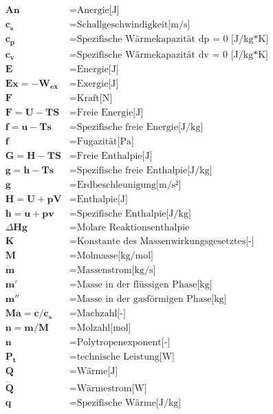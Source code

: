 \documentclass[twocolumn]{article}
\begin{document}
\begin{align*}
	\mathbf{An}		&=	\text{Anergie[J]} \\
	\mathbf{c_s}		&=	\text{Schallgeschwindigkeit[m/s]} \\
	\mathbf{c_p}		&=	\text{Spezifische Wärmekapazität dp = 0 [J/kg*K]} \\
	\mathbf{c_v}		&=	\text{Spezifische Wärmekapazität dv = 0 [J/kg*K]} \\
	\mathbf{E}		&=	\text{Energie[J]} \\
	\mathbf{Ex = -W_{ex}}	&=	\text{Exergie[J]} \\
	\mathbf{F}		&=	\text{Kraft[N]} \\
	\mathbf{F = U - TS}	&=	\text{Freie Energie[J]} \\
	\mathbf{f = u-Ts}	&=	\text{Spezifische freie Energie[J/kg]} \\
	\mathbf{f}		&=	\text{Fugazität[Pa]} \\
	\mathbf{G = H -TS}	&=	\text{Freie Enthalpie[J]} \\
	\mathbf{g = h -Ts}	&=	\text{Spezifische freie Enthalpie[J/kg]} \\
	\mathbf{g}		&=	\text{Erdbeschleunigung[m/s²]} \\
	\mathbf{H = U+pV}	&=	\text{Enthalpie[J]} \\
	\mathbf{h = u + pv}	&=	\text{Spezifische Enthalpie[J/kg]} \\
	\Delta \mathbf{Hg}	&=	\text{Molare Reaktionsenthalpie} \\
	\mathbf{K}		&=	\text{Konstante des Massenwirkungsgesetztes[-]} \\
	\mathbf{M}		&=	\text{Molmasse[kg/mol]} \\
	\mathbf{\dot{m}}	&=	\text{Massenstrom[kg/s]} \\
	\mathbf{m'}		&=	\text{Masse in der flüssigen Phase[kg]} \\
	\mathbf{m''}		&=	\text{Masse in der gasförmigen Phase[kg]} \\
	\mathbf{Ma=c/c_s}	&=	\text{Machzahl[-]} \\
	\mathbf{n=m/M}		&=	\text{Molzahl[mol]} \\
	\mathbf{n}		&=	\text{Polytropenexponent[-]} \\
	\mathbf{P_t}		&=	\text{technische Leistung[W]} \\
	\mathbf{Q}		&=	\text{Wärme[J]} \\
	\mathbf{\dot{Q}}	&=	\text{Wärmestrom[W]} \\
	\mathbf{q}		&=	\text{Spezifische Wärme[J/kg]} \\

\end{align*}
\end{document}
